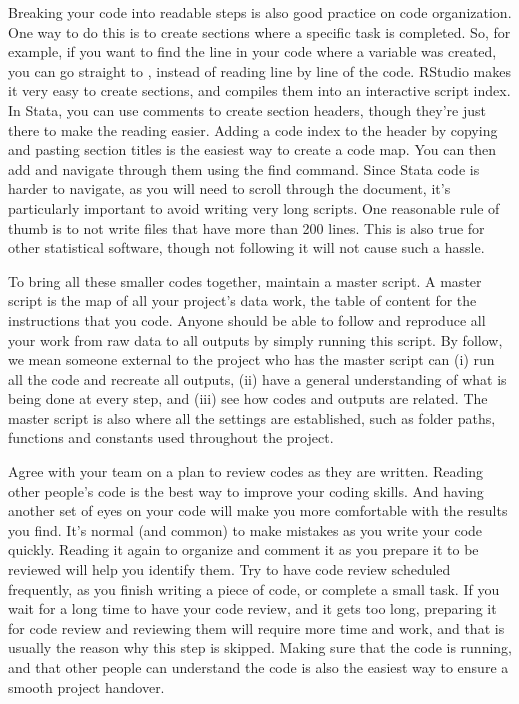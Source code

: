 Breaking your code into readable steps is also good practice on code organization. 
One way to do this is to create sections where a specific task is completed. 
So, for example, if you want to find the line in your code where a variable was created, 
you can go straight to , 
instead of reading line by line of the code.
RStudio makes it very easy to create sections, and compiles them into an interactive script index. 
In Stata, you can use comments to create section headers, 
though they're just there to make the reading easier. 
Adding a code index to the header by copying and pasting section titles is the easiest way to create a code map.
You can then add and navigate through them using the find command. 
Since Stata code is harder to navigate, as you will need to scroll through the document,
it's particularly important to avoid writing very long scripts. 
One reasonable rule of thumb is to not write files that have more than 200 lines. 
This is also true for other statistical software, 
though not following it will not cause such a hassle.

To bring all these smaller codes together, maintain a master script.
A master script is the map of all your project's data work, 
the table of content for the instructions that you code.
Anyone should be able to follow and reproduce all your work from
raw data to all outputs by simply running this script.
By follow, we mean someone external to the project who has the master script can 
(i) run all the code and recreate all outputs, 
(ii) have a general understanding of what is being done at every step, and
(iii) see how codes and outputs are related. 
The master script is also where all the settings are established, 
such as folder paths, functions and constants used throughout the project.

Agree with your team on a plan to review codes as they are written. 
Reading other people's code is the best way to improve your coding skills. 
And having another set of eyes on your code will make you more comfortable with the results you find. 
It's normal (and common) to make mistakes as you write your code quickly. 
Reading it again to organize and comment it as you prepare it to be reviewed will help you identify them.
Try to have code review scheduled frequently, as you finish writing a piece of code, or complete a small task.
If you wait for a long time to have your code review, and it gets too long, 
preparing it for code review and reviewing them will require more time and work, 
and that is usually the reason why this step is skipped. 
Making sure that the code is running, 
and that other people can understand the code is also the easiest way to ensure a smooth project handover.


